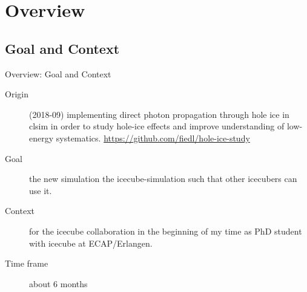 
\newcommand\done{\checkmark\xspace}
\newcommand\inprogress{$\Rightarrow$\xspace}
\newcommand\tobedone{$\square$\xspace}

\section{Overview}
\subsection{Goal and Context}
\begin{frame}{Overview: Goal and Context}
  \begin{description}
    \item[Origin]  (2018-09) implementing direct photon propagation through hole ice in clsim in order to study hole-ice effects and improve understanding of low-energy systematics. \small \url{https://github.com/fiedl/hole-ice-study} \normalsize

    \item[Goal]  the new simulation  the icecube-simulation  such that other icecubers can use it.

    \item[Context]  for the icecube collaboration in the beginning of my time as PhD student with icecube at ECAP/Erlangen.

    \item[Time frame] about 6 months
  \end{description}
\end{frame}

